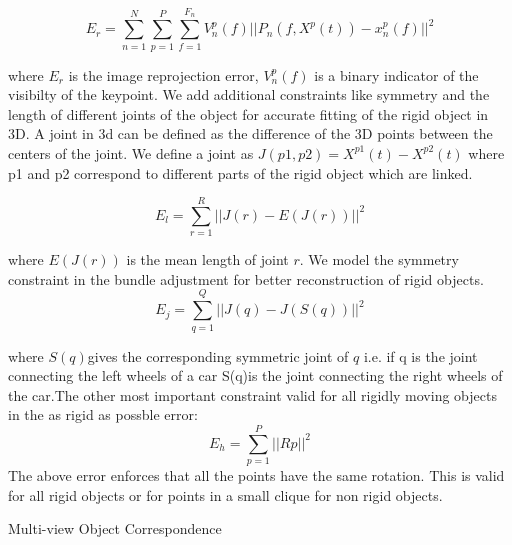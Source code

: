 \documentclass[10pt,twocolumn,letterpaper]{article}
\makeatletter
\def\BState{\State\hskip-\ALG@thistlm}
\makeatother
\begin{document}
\begin{equation}
  	E_r =\sum_{n=1}^{N} \sum_{p=1}^P \sum_{f=1}^{F_n} V_n^p(f) ||P_n(f,X^p(t)) - x_n^p(f)||^2
\end{equation}
   
where $E_r$ is the image reprojection error, $V_n^p(f)$ is a binary indicator of the visibilty of the keypoint. We add additional constraints like symmetry and the length of different joints of the object for accurate fitting of the rigid object in 3D. A joint in 3d can be defined as the difference of the 3D points between the centers of the joint. We define a joint as $J(p1,p2) = X^{p1}(t) - X^{p2}(t) $ where p1 and p2 correspond to different parts of the rigid object which are linked. 

\begin{equation}
  	E_l = \sum_{r=1}^R ||J(r) - E(J(r))||^2  
\end{equation}

where $E(J(r))$ is the mean length of joint $r$. We model the symmetry constraint in the bundle adjustment for better reconstruction of rigid objects.
\begin{equation}
  	E_j = \sum_{q = 1}^Q ||J(q) - J(S(q))||^2
\end{equation}

where $S(q)$gives the corresponding symmetric joint of $q$ i.e. if q is the joint connecting the left wheels of a car S(q)is the joint connecting the right wheels of the car.The other most important constraint valid for all rigidly moving objects in the as rigid as possble error:
\begin{equation}
  	E_h = \sum_{p=1}^P ||Rp||^2
\end{equation}
The above error enforces that all the points have the same rotation. This is valid for all rigid objects or for points in a small clique for non rigid objects.


\begin{algorithm}
\caption{Multi-view Object Correspondence}\label{euclid}
\end{algorithm}
\end{document}
